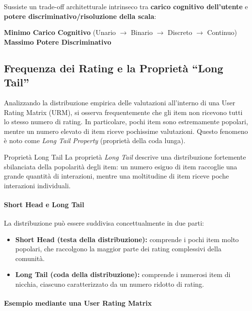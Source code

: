 Sussiste un trade-off architetturale intrinseco tra \textbf{carico cognitivo dell'utente} e \textbf{potere discriminativo/risoluzione della scala}:
\begin{center}
\small
\textbf{Minimo Carico Cognitivo} (Unario $\rightarrow$ Binario $\rightarrow$ Discreto $\rightarrow$ Continuo) \textbf{Massimo Potere Discriminativo}
\end{center}

\subsection{Frequenza dei Rating e la Proprietà ``Long Tail''}

Analizzando la distribuzione empirica delle valutazioni all'interno di una User Rating Matrix (URM), si osserva frequentemente che gli item non ricevono tutti lo stesso numero di rating. In particolare, pochi item sono estremamente popolari, mentre un numero elevato di item riceve pochissime valutazioni. Questo fenomeno è noto come \textit{Long Tail Property} (proprietà della coda lunga).

\begin{definition}{Proprietà Long Tail}
La proprietà \textit{Long Tail} descrive una distribuzione fortemente sbilanciata della popolarità degli item: un numero esiguo di item raccoglie una grande quantità di interazioni, mentre una moltitudine di item riceve poche interazioni individuali.
\end{definition}

\paragraph{Short Head e Long Tail}

La distribuzione può essere suddivisa concettualmente in due parti:

\begin{itemize}
\item \textbf{Short Head (testa della distribuzione):} comprende i pochi item molto popolari, che raccolgono la maggior parte dei rating complessivi della comunità.
\item \textbf{Long Tail (coda della distribuzione):} comprende i numerosi item di nicchia, ciascuno caratterizzato da un numero ridotto di rating.
\end{itemize}

\paragraph{Esempio mediante una User Rating Matrix}

